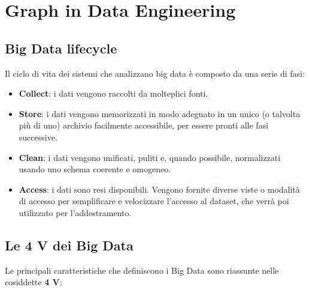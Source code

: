 \section{Graph in Data Engineering}
\subsection{Big Data lifecycle}
Il ciclo di vita dei sistemi che analizzano big data è composto da una serie di fasi:

\begin{itemize}
    \item \textbf{Collect}: i dati vengono raccolti da molteplici fonti.
    
    \item \textbf{Store}: i dati vengono memorizzati in modo adeguato in un unico (o talvolta più di uno) 
    archivio facilmente accessibile, per essere pronti alle fasi successive.
    
    \item \textbf{Clean}: i dati vengono unificati, puliti e, quando possibile, normalizzati usando uno 
    schema coerente e omogeneo.
    
    \item \textbf{Access}: i dati sono resi disponibili. Vengono fornite diverse viste o modalità di accesso 
    per semplificare e velocizzare l'accesso al dataset, che verrà poi utilizzato per l'addestramento.
\end{itemize}

\subsection*{Le 4 V dei Big Data}

Le principali caratteristiche che definiscono i Big Data sono riassunte nelle cosiddette \textbf{4 V}:

